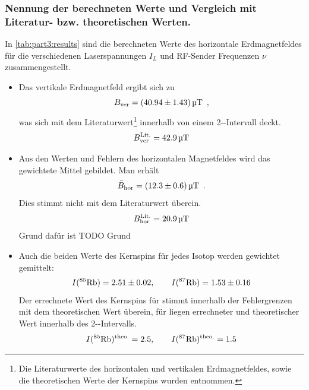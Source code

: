 \subsubsection{Nennung der berechneten Werte und Vergleich mit Literatur- bzw. theoretischen Werten.}
In \autoref{tab:part3:results} sind die berechneten Werte des horizontale Erdmagnetfeldes für die verschiedenen Laserspannungen $I_L$ und 
RF-Sender Frequenzen $\nu$ zusammengestellt. 
\begin{itemize}
    \item Das vertikale Erdmagnetfeld ergibt sich zu
    \begin{equation}
        B_\text{ver} = (40.94 \pm 1.43)\,\text{\textmu T}\ \, ,
    \end{equation}
    was sich mit dem Literaturwert\footnote{Die Literaturwerte des horizontalen und vertikalen Erdmagnetfeldes, sowie die theoretischen Werte der
    Kernspins wurden \cite{manual} entnommen.} innerhalb von einem 2-\textsigma-Intervall deckt.
    \begin{equation}
        B_\text{ver}^{\text{Lit.}} = 42.9\,\text{\textmu T}
    \end{equation}
    \item Aus den Werten und Fehlern des horizontalen Magnetfeldes wird das gewichtete Mittel gebildet. Man erhält
    \begin{equation}
        \bar{B}_\text{hor} = (12.3 \pm 0.6)\,\text{\textmu T}\ \, .
    \end{equation}
    Dies stimmt nicht mit dem Literaturwert überein.
    \begin{equation}
        B_\text{hor}^{\text{Lit.}} = 20.9\,\text{\textmu T}
    \end{equation}
    Grund dafür ist TODO Grund \\ %
    \item Auch die beiden Werte des Kernspins für jedes Isotop werden gewichtet gemittelt:
    \begin{equation}
        I(\text{$^{85}$Rb}) = 2.51 \pm 0.02, \qquad I(\text{$^{87}$Rb}) = 1.53 \pm 0.16
    \end{equation}
    Der errechnete Wert des Kernspins für  stimmt innerhalb der Fehlergrenzen mit dem theoretischen Wert überein, für  liegen
    errechneter und theoretischer Wert innerhalb des 2-\textsigma-Intervalls.
    \begin{equation}
        I(\text{$^{85}$Rb})^\text{theo.} = 2.5, \qquad I(\text{$^{87}$Rb})^\text{theo.} = 1.5
    \end{equation}
\end{itemize}